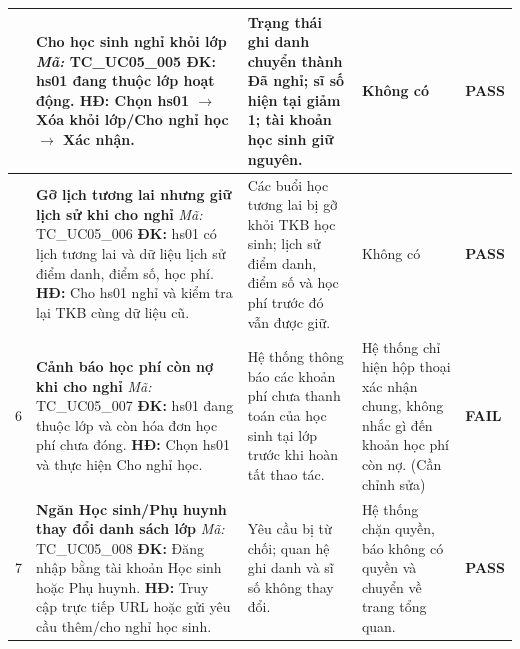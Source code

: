 \begin{longtable}{|>{\centering\arraybackslash}p{0.8cm}|>{\raggedright\arraybackslash}p{4.6cm}|>{\raggedright\arraybackslash}p{3.8cm}|>{\raggedright\arraybackslash}p{3.8cm}|>{\centering\arraybackslash}p{1.5cm}|}
4 & \textbf{Cho học sinh nghỉ khỏi lớp} \newline\newline \textit{Mã:} TC\_UC05\_005 \newline\newline \textbf{ĐK:} hs01 đang thuộc lớp hoạt động. \newline \textbf{HĐ:} Chọn hs01 $\rightarrow$ Xóa khỏi lớp/Cho nghỉ học $\rightarrow$ Xác nhận. 
& Trạng thái ghi danh chuyển thành Đã nghỉ; sĩ số hiện tại giảm 1; tài khoản học sinh giữ nguyên. 
& Không có 
& \textbf{PASS} \\
\hline

5 & \textbf{Gỡ lịch tương lai nhưng giữ lịch sử khi cho nghỉ} \newline\newline \textit{Mã:} TC\_UC05\_006 \newline\newline \textbf{ĐK:} hs01 có lịch tương lai và dữ liệu lịch sử điểm danh, điểm số, học phí. \newline \textbf{HĐ:} Cho hs01 nghỉ và kiểm tra lại TKB cùng dữ liệu cũ. 
& Các buổi học tương lai bị gỡ khỏi TKB học sinh; lịch sử điểm danh, điểm số và học phí trước đó vẫn được giữ. 
& Không có 
& \textbf{PASS} \\
\hline

6 & \textbf{Cảnh báo học phí còn nợ khi cho nghỉ} \newline\newline \textit{Mã:} TC\_UC05\_007 \newline\newline \textbf{ĐK:} hs01 đang thuộc lớp và còn hóa đơn học phí chưa đóng. \newline \textbf{HĐ:} Chọn hs01 và thực hiện Cho nghỉ học. 
& Hệ thống thông báo các khoản phí chưa thanh toán của học sinh tại lớp trước khi hoàn tất thao tác. 
& Hệ thống chỉ hiện hộp thoại xác nhận chung, không nhắc gì đến khoản học phí còn nợ. (Cần chỉnh sửa) 
& \textbf{FAIL} \\
\hline

7 & \textbf{Ngăn Học sinh/Phụ huynh thay đổi danh sách lớp} \newline\newline \textit{Mã:} TC\_UC05\_008 \newline\newline \textbf{ĐK:} Đăng nhập bằng tài khoản Học sinh hoặc Phụ huynh. \newline \textbf{HĐ:} Truy cập trực tiếp URL hoặc gửi yêu cầu thêm/cho nghỉ học sinh. 
& Yêu cầu bị từ chối; quan hệ ghi danh và sĩ số không thay đổi. 
& Hệ thống chặn quyền, báo không có quyền và chuyển về trang tổng quan. 
& \textbf{PASS} \\
\hline

\end{longtable}
